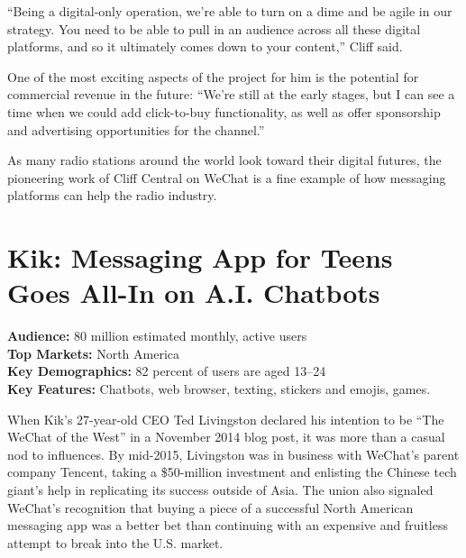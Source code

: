 \documentclass[notoc, symmetric, nobib, nols]{towcenter-guideto-book}
\begin{document}




``Being a digital-only operation, we're able to turn on a dime and be agile in our strategy. You need to be able to pull in an audience across all these digital platforms, and so it ultimately comes down to your content,'' Cliff said.

One of the most exciting aspects of the project for him is the potential for commercial revenue in the future: ``We're still at the early stages, but I can see a time when we could add click-to-buy functionality, as well as offer sponsorship and advertising opportunities for the channel.''

As many radio stations around the world look toward their digital futures, the pioneering work of Cliff Central on WeChat is a fine example of how messaging platforms can help the radio industry.

\section[Kik: Messaging App for Teens Goes All-In on A.I. Chatbots]{Kik: Messaging App for Teens Goes All-In \protect\newline on A.I. Chatbots}
\begin{framed}
\noindent\textbf{Audience:} 80 million estimated monthly, active users \\
\noindent\textbf{Top Markets:} North America \\
\noindent\textbf{Key Demographics:} 82 percent of users are aged 13--24 \\
\noindent\textbf{Key Features:} Chatbots, web browser, texting, stickers and emojis, games.
\end{framed}

When Kik's 27-year-old CEO Ted Livingston declared his intention to be ``The WeChat of the West'' in a November 2014 blog post,\autocite{MediumKik} it was more than a casual nod to influences. By mid-2015, Livingston was in business with WeChat's parent company Tencent, taking a \$50-million investment and enlisting the Chinese tech giant's help in replicating its success outside of Asia. The union also signaled WeChat's recognition that buying a piece of a successful North American messaging app was a better bet than continuing with an expensive and fruitless attempt to break into the U.S. market.
\end{document}
